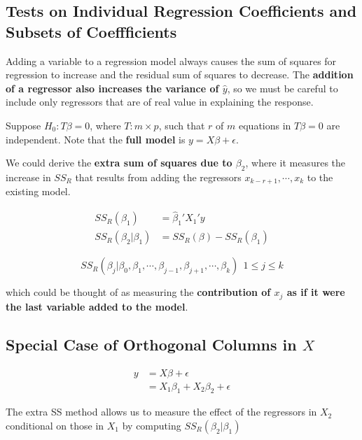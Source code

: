 \documentclass[12pt]{article}
\begin{document}
\subsection{Tests on Individual Regression Coefficients and Subsets of Coeffficients}

Adding a variable to a regression model always causes the sum of squares for regression to increase and the residual sum of squares to decrease. The \textbf{addition of a regressor also increases the variance of $\hat{y}$}, so we must be careful to include only regressors that are of real value in explaining the response. 



Suppose $H_0 : T\beta = 0$, where $T : m \times p$, such that $r$ of $m$ equations in $T \beta = 0$ are independent. Note that the \textbf{full model} is $y = X \beta + \epsilon$.

We could derive the \textbf{extra sum of squares due to $\beta_2$}, where it measures the increase in $SS_R$ that results from adding the regressors $x_{k-r+1}, \cdots, x_k$ to the existing model. 

$$
\begin{aligned}
SS_R(\beta_1) &= \hat{\beta}_1' X_1' y \\[8pt]
SS_R(\beta_2 | \beta_1) &= SS_R (\beta) - SS_R(\beta_1)
\end{aligned}
$$




$$
SS_R (\beta_j | \beta_0, \beta_1, \cdots, \beta_{j-1}, \beta_{j+1}, \cdots, \beta_k) \ \ 1 \le j \le k
$$

which could be thought of as measuring the \textbf{contribution of $x_j$ as if it were the last variable added to the model}. 





\subsection{Special Case of Orthogonal Columns in $X$}

$$
\begin{aligned}
y &= X\beta + \epsilon \\[8pt]
&= X_1 \beta_1 + X_2 \beta_2 + \epsilon
\end{aligned}
$$

The extra SS method allows us to measure the effect of the regressors in $X_2$ conditional on those in $X_1$ by computing $SS_R(\beta_2 | \beta_1)$
\end{document}
